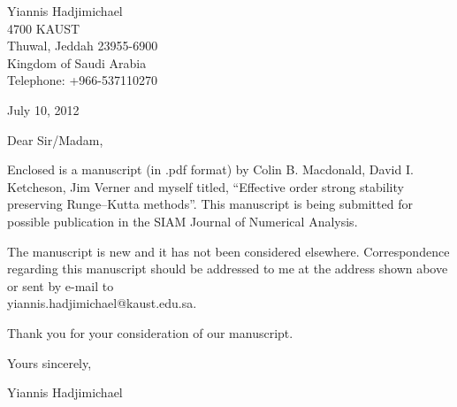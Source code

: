 \documentclass[10pt,a4paper,oneside]{article}
\renewcommand{\newline}{\vspace{10pt}}
\begin{document}
\begin{flushright}
Yiannis Hadjimichael \\
4700 KAUST \\
Thuwal, Jeddah 23955-6900 \\
Kingdom of Saudi Arabia \\
Telephone: +966-537110270 \\\vspace{10pt}

July 10, 2012
\end{flushright}


Dear Sir/Madam,
\newline

Enclosed is a manuscript (in .pdf format) by Colin B. Macdonald, 
David I. Ketcheson, Jim Verner and myself titled, 
``Effective order strong stability preserving Runge--Kutta methods''. 
This manuscript is being submitted for possible publication in the 
SIAM Journal of Numerical Analysis.
\newline

The manuscript is new and it has not been considered elsewhere. 
Correspondence regarding this manuscript should be addressed to me at
the address shown above or sent by e-mail to \\
yiannis.hadjimichael@kaust.edu.sa.
\newline

Thank you for your consideration of our manuscript. 
\newline
\vspace{20pt}

Yours sincerely,
\newline
\vspace{10pt}

Yiannis Hadjimichael
\end{document}
